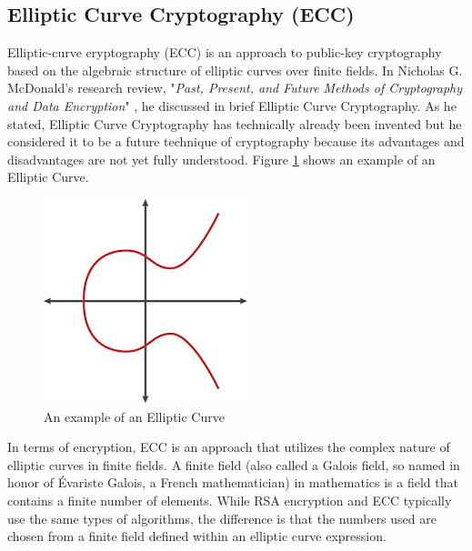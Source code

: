 \documentclass[journal]{IEEEtran}
\begin{document}
\subsection{\textbf{Elliptic Curve Cryptography (ECC)}}
Elliptic-curve cryptography (ECC) is an approach to public-key cryptography based on the algebraic structure of elliptic curves over finite fields. In Nicholas G. McDonald's research review, "\textit{Past, Present, and Future Methods of Cryptography and Data Encryption}" \cite{encryption_research}, he discussed in brief Elliptic Curve Cryptography. As he stated, Elliptic Curve Cryptography has technically already been invented but he considered it to be a future technique of cryptography because its advantages and disadvantages are not yet fully understood. Figure \ref{fig:ecc} shows an example of an Elliptic Curve.

\newline
\begin{figure}[!h]
    \centering
    \includegraphics[scale=.5]{ecc2}
    \caption{An example of an Elliptic Curve}
    \label{fig:ecc}
\end{figure}

In terms of encryption, ECC is an approach that utilizes the complex nature of elliptic curves in finite fields. A finite field (also called a Galois field, so named in honor of Évariste Galois, a French mathematician) in mathematics is a field that contains a finite number of elements. While RSA encryption and ECC typically use the same types of algorithms, the difference is that the numbers used are chosen from a finite field defined within an elliptic curve expression.
\end{document}
